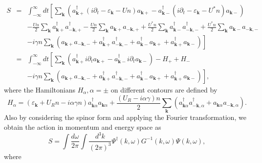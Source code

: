 \documentclass{article}
\newcommand{\tmmathbf}[1]{\ensuremath{\boldsymbol{#1}}}
\begin{document}
\begin{eqnarray}
  S & = & \int_{- \infty}^{\infty} d t \left[ \sum_{\tmmathbf{k}}
  (a^{\dagger}_{\tmmathbf{k}+} (i \partial_t - \varepsilon_{\tmmathbf{k}} - U
  n) a_{\tmmathbf{k}+} - a^{\dagger}_{\tmmathbf{k}-} (i \partial_t -
  \varepsilon_{\tmmathbf{k}} - U^{\ast} n) a_{\tmmathbf{k}-}) \right.
  \nonumber\\
  &  & - \frac{U n}{2} \sum_{\tmmathbf{k}} a_{\tmmathbf{k}+}^{\dagger}
  a_{-\tmmathbf{k}, +}^{\dagger} - \frac{U n}{2} \sum_{\tmmathbf{k}}
  a_{\tmmathbf{k}+} a_{-\tmmathbf{k}, +} + \frac{U^{\ast} n}{2}
  \sum_{\tmmathbf{k}} a_{\tmmathbf{k}-}^{\dagger} a_{-\tmmathbf{k},
  -}^{\dagger} + \frac{U^{\ast} n}{2} \sum_{\tmmathbf{k}} a_{\tmmathbf{k}-}
  a_{-\tmmathbf{k}, -} \nonumber\\
  &  & - i \gamma n \left. \sum_{\tmmathbf{k}} (a_{\tmmathbf{k}+}
  a_{-\tmmathbf{k}, -} + a_{\tmmathbf{k}+}^{\dagger} a_{-\tmmathbf{k},
  -}^{\dagger} + a_{\tmmathbf{k}-}^{\dagger} a_{\tmmathbf{k}+} +
  a_{\tmmathbf{k}+}^{\dagger} a_{\tmmathbf{k}-}) \right] \\
  & = & \int_{- \infty}^{\infty} d t \left[ \sum_{\tmmathbf{k}}
  (a^{\dagger}_{\tmmathbf{k}+} i \partial_t a_{\tmmathbf{k}+} -
  a^{\dagger}_{\tmmathbf{k}-} i \partial_t a_{\tmmathbf{k}-}) - H_+ + H_-
  \right. \nonumber\\
  &  & - i \gamma n \left. \sum_{\tmmathbf{k}} (a_{\tmmathbf{k}+}
  a_{-\tmmathbf{k}, -} + a_{\tmmathbf{k}+}^{\dagger} a_{-\tmmathbf{k},
  -}^{\dagger} + a_{\tmmathbf{k}-}^{\dagger} a_{\tmmathbf{k}+} +
  a_{\tmmathbf{k}+}^{\dagger} a_{\tmmathbf{k}-}) \right], 
\end{eqnarray}
where the Hamiltonians $H_{\alpha}, \alpha = \pm$ on different contours are
defined by
\begin{equation}
  H_{\alpha} = (\varepsilon_{\tmmathbf{k}} + U_R n - i \alpha \gamma n)
  a^{\dagger}_{\tmmathbf{k} \alpha} a_{\tmmathbf{k} \alpha} + \frac{(U_R - i
  \alpha \gamma) n}{2} \sum_{\tmmathbf{k}} (a_{\tmmathbf{k} \alpha}^{\dagger}
  a_{-\tmmathbf{k}, \alpha}^{\dagger} + a_{\tmmathbf{k} \alpha}
  a_{-\tmmathbf{k}, \alpha}) .
\end{equation}
Also by considering the spinor form and applying the Fourier transformation,
we obtain the action in momentum and energy space as
\begin{equation}
  S = \int \frac{d \omega}{2 \pi} \int \frac{d^3 k}{(2 \pi)^3} \Psi^{\dagger}
  (k, \omega) G^{- 1} (k, \omega) \Psi (k, \omega),
\end{equation}
where
\end{document}
